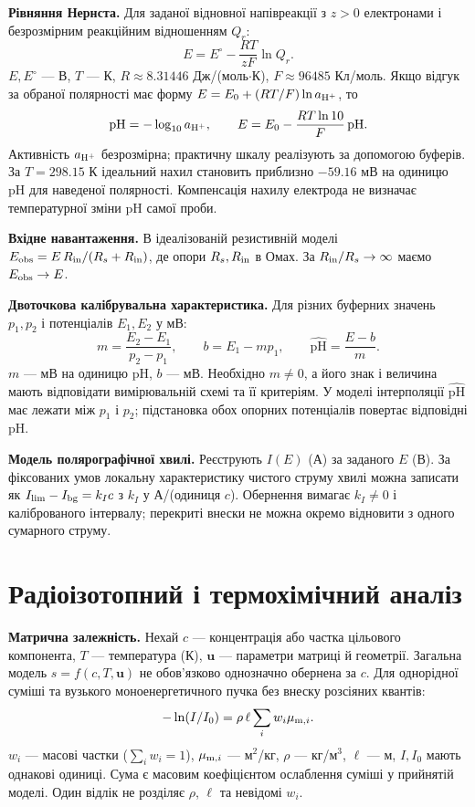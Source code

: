 \documentclass[11pt,a4paper]{article}
\begin{document}
\textbf{Рівняння Нернста.}
Для заданої відновної напівреакції з $z>0$ електронами і безрозмірним реакційним відношенням $Q_r$:
\[
 E=E^\circ-\frac{RT}{zF}\ln Q_r .
\]
$E,E^\circ$ --- В, $T$ --- К, $R\approx8.31446$ Дж/(моль$\cdot$К), $F\approx96485$ Кл/моль. Якщо відгук за обраної полярності має форму $E=E_0+(RT/F)\ln a_{\rm H^+}$, то
\[
 \mathrm{pH}=-\log_{10}a_{\rm H^+},
 \qquad E=E_0-\frac{RT\ln 10}{F}\,\mathrm{pH}.
\]
Активність $a_{\rm H^+}$ безрозмірна; практичну шкалу реалізують за допомогою буферів. За $T=298.15$ К ідеальний нахил становить приблизно $-59.16$ мВ на одиницю pH для наведеної полярності. Компенсація нахилу електрода не визначає температурної зміни pH самої проби.

\textbf{Вхідне навантаження.}
В ідеалізованій резистивній моделі $E_{\rm obs}=E\,R_{\rm in}/(R_s+R_{\rm in})$, де опори $R_s,R_{\rm in}$ в Омах. За $R_{\rm in}/R_s\to\infty$ маємо $E_{\rm obs}\to E$.

\textbf{Двоточкова калібрувальна характеристика.}
Для різних буферних значень $p_1,p_2$ і потенціалів $E_1,E_2$ у мВ:
\[
 m=\frac{E_2-E_1}{p_2-p_1},\qquad b=E_1-mp_1,\qquad
 \widehat{\mathrm{pH}}=\frac{E-b}{m}.
\]
$m$ --- мВ на одиницю pH, $b$ --- мВ. Необхідно $m\ne0$, а його знак і величина мають відповідати вимірювальній схемі та її критеріям. У моделі інтерполяції $\widehat{\mathrm{pH}}$ має лежати між $p_1$ і $p_2$; підстановка обох опорних потенціалів повертає відповідні pH.

\textbf{Модель полярографічної хвилі.}
Реєструють $I(E)$ (А) за заданого $E$ (В). За фіксованих умов локальну характеристику чистого струму хвилі можна записати як $I_{\rm lim}-I_{\rm bg}=k_I c$ з $k_I$ у А/(одиниця $c$). Обернення вимагає $k_I\ne0$ і каліброваного інтервалу; перекриті внески не можна окремо відновити з одного сумарного струму.

\section{Радіоізотопний і термохімічний аналіз}

\textbf{Матрична залежність.}
Нехай $c$ --- концентрація або частка цільового компонента, $T$ --- температура (К), $\mathbf u$ --- параметри матриці й геометрії. Загальна модель $s=f(c,T,\mathbf u)$ не обов’язково однозначно обернена за $c$. Для однорідної суміші та вузького моноенергетичного пучка без внеску розсіяних квантів:
\[
 -\ln(I/I_0)=\rho\,\ell\sum_i w_i\mu_{{\rm m},i}.
\]
$w_i$ --- масові частки ($\sum_i w_i=1$), $\mu_{{\rm m},i}$ --- м$^2$/кг, $\rho$ --- кг/м$^3$, $\ell$ --- м, $I,I_0$ мають однакові одиниці. Сума є масовим коефіцієнтом ослаблення суміші у прийнятій моделі. Один відлік не розділяє $\rho$, $\ell$ та невідомі $w_i$.
\end{document}
